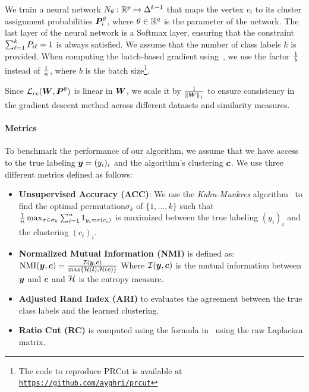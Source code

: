 We train a neural network $ N_\theta: {\mathbb{R}}^p \mapsto \Delta^{k-1} $ that maps the
vertex $v_i$ to its cluster assignment probabilities $ {\bm{P}}^{\theta}_{i} $, where $
\theta \in \mathbb{R}^q $ is the parameter of the network. The last layer of the neural
network is a Softmax layer, ensuring that the constraint $ \sum_{\ell=1}^k
{P}_{i\ell} = 1 $ is always satisfied. We assume that the number of class labels
$k$ is provided. When computing the batch-based gradient
using~, we use the factor ${\frac{1}{b}}$ instead of ${\frac{1}{n}}$,
where $ b $ is the batch size\footnote{The code to reproduce PRCut is available at \href{https://github.com/ayghri/prcut}{\texttt{https://github.com/ayghri/prcut}}}.



Since $ {\mathcal{L}}_{rc}({\bm{W}}, {\bm{P}}^\theta) $ is linear in
${\bm{W}}$, we scale it by $\frac{1}{\left\lVert{\bm{W}}\right\rVert_1} $ to ensure consistency in the
gradient descent method across different datasets and similarity measures.

\paragraph{Metrics} To benchmark the performance of our algorithm, we assume that we have access to the
true labeling ${\bm{y}}=(y_i)_i$ and the algorithm's clustering ${\bm{c}}$. We use three
different metrics defined as follows:

\begin{itemize}
	\item \textbf{Unsupervised Accuracy (ACC)}: We use the \textit{Kuhn-Munkres} algorithm~\citep{munkres} to find the
	      optimal permutation$\sigma_k$ of $\{1,\ldots,k\}$ such that ${\frac{1}{n}}\max_{\sigma\in
			      \sigma_k} \sum_{i=1}^{n} 1_{y_i = \sigma(c_i)}$ is maximized between the
	      true labeling $(y_i)_i$ and the clustering $(c_i)_i$.

	\item \textbf{Normalized Mutual Information (NMI)} is defined as:
	      $\text{NMI}({\bm{y}}, {\bm{c}}) = \frac{\mathcal{I}({\bm{y}}, {\bm{c}})}{\max\{\mathcal{H}({\bm{l}}),\mathcal{H}({\bm{c}})\}}$
	      Where $\mathcal{I}({\bm{y}}, {\bm{c}})$ is the mutual information between ${\bm{y}}$ and ${\bm{c}}$ and
	      ${\mathcal{H}}$ is the entropy measure.
	\item \textbf{Adjusted Rand Index (ARI)} to evaluates the agreement between
	      the true class labels and the learned clustering.
	\item \textbf{Ratio Cut (RC)} is computed using the formula in~
	      using the raw Laplacian matrix.

\end{itemize}


